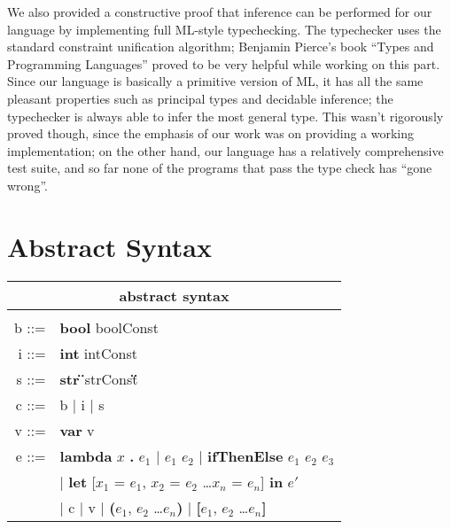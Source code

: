 \documentclass[10pt, oneside]{article}
\begin{document}
We also provided a constructive proof that inference can be performed for our
language by implementing full ML-style typechecking. The typechecker uses
the standard constraint unification algorithm; Benjamin Pierce's book ``Types
and Programming Languages'' proved to be very helpful while working on this
part. Since our language is basically a primitive version of ML, it has all the
same pleasant properties such as principal types and decidable inference; the
typechecker is always able to infer the most general type. This wasn't
rigorously proved though, since the emphasis of our work was on providing a
working implementation; on the other hand, our language has a relatively
comprehensive test suite, and so far none of the programs that pass the type
check has ``gone wrong''.



\section {Abstract Syntax}

\begin{center}
\begin{tabular}{rl}
\multicolumn{2}{c}{abstract syntax}\\
\hline\\

b ::=& \textbf{bool} boolConst\\
i ::=& \textbf{int} intConst\\
s ::=& \textbf{str \"}strConst\textbf{\"}\\
c ::=& b $|$ i $|$ s\\
v ::=& \textbf{var} v\\

e ::=& \textbf{lambda} $x$ \textbf{.} $e_1$ $|$ $e_1$ $e_2$ $|$ \textbf{ifThenElse} $e_1$ $e_2$ $e_3$\\
&$|$ \textbf{let} [$x_1$ = $e_1$, $x_2$ = $e_2$ \ldots $x_n$ = $e_n$] \textbf{in} $e'$\\
&$|$ c $|$ v $|$ \textbf{(}$e_1$, $e_2$ \ldots $e_n$\textbf{)} $|$ \textbf{[}$e_1$, $e_2$ \ldots $e_n$\textbf{]}\\


\end{tabular}
\end{center}
\end{document}
